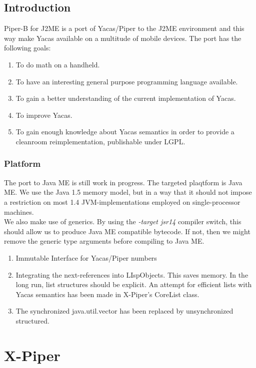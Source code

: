 \section{Introduction}

Piper-B for J2ME is a port of Yacas/Piper to the J2ME environment and this way
make Yacas available on a multitude of mobile devices. The port has the
following goals:
\begin{enumerate}
\item To do math on a handheld.
\item To have an interesting general purpose programming language available.
\item To gain a better understanding of the current implementation of Yacas.
\item To improve Yacas.
\item To gain enough knowledge about Yacas semantics in order to provide
a cleanroom reimplementation, publishable under LGPL.
\end{enumerate}

\subsection{Platform}

The port to Java ME is still work in progress. The targeted plaqtform
is Java ME. We use the Java 1.5 memory model, but in a way that it
should not impose a restriction on most 1.4 JVM-implementations employed
on single-processor machines.\\
We also make use of generics. By using the {\em -target jsr14} compiler
switch, this should allow us to produce Java ME compatible bytecode.
If not, then we might remove the generic type arguments before compiling
to Java ME.

\begin{enumerate}
\item Immutable Interface for Yacas/Piper numbers
\item Integrating the next-references into LIspObjects. This saves memory.
In the long run, list structures should be explicit. An attempt for
efficient lists with Yacas semantics has been made in X-Piper's CoreList class.
\item The synchronized java.util.vector has been replaced by unsynchronized
structured.
\end{enumerate}


\chapter{X-Piper}

